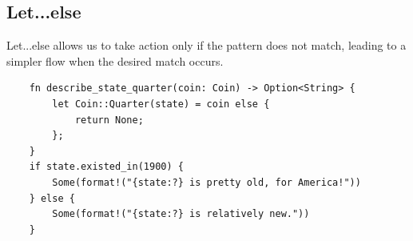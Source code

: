 \documentclass[]{article}
\begin{document}
\subsection{Let...else}

Let...else allows us to take action only if the pattern does not match, leading to a simpler flow when the desired match occurs.
\begin{verbatim}
	fn describe_state_quarter(coin: Coin) -> Option<String> {
		let Coin::Quarter(state) = coin else {
			return None;
		};
	}
	if state.existed_in(1900) {
		Some(format!("{state:?} is pretty old, for America!"))
	} else {
		Some(format!("{state:?} is relatively new."))
	}
\end{verbatim}
\printindex
\end{document}
